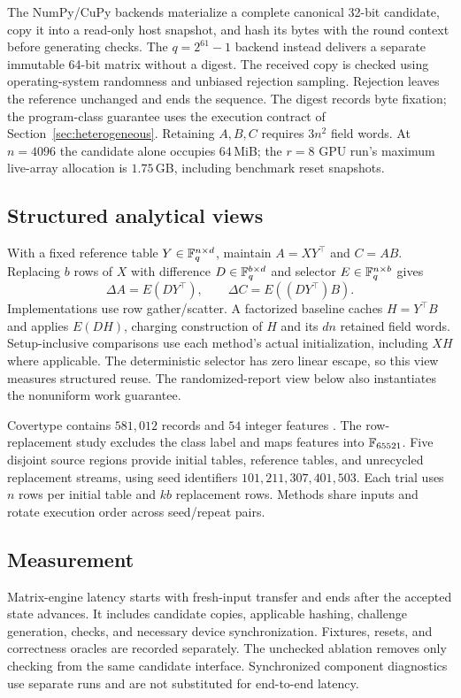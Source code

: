 The NumPy/CuPy backends materialize a complete canonical 32-bit candidate,
copy it into a read-only host snapshot, and hash its bytes with the round
context before generating checks. The $q=2^{61}-1$ backend instead
delivers a separate immutable 64-bit matrix without a digest.
The received copy is checked using
operating-system randomness and unbiased rejection sampling. Rejection
leaves the reference unchanged and ends the sequence. The digest records
byte fixation; the program-class guarantee uses the execution contract
of Section~\ref{sec:heterogeneous}.
Retaining $A,B,C$ requires $3n^2$ field words. At $n=4096$ the candidate
alone occupies $64$\,MiB; the $r=8$ GPU run's maximum live-array
allocation is $1.75$\,GB, including benchmark reset snapshots.

\subsection{Structured analytical views}
With a fixed reference table $Y\in\mathbb F_q^{n\times d}$, maintain
$A=XY^\top$ and $C=AB$. Replacing $b$ rows of $X$ with difference
$D\in\mathbb F_q^{b\times d}$ and selector $E\in\mathbb F_q^{n\times b}$ gives
\begin{equation}\label{eq:structured-update}
 \Delta A=E(DY^\top),\qquad \Delta C=E((DY^\top)B).
\end{equation}
Implementations use row gather/scatter. A factorized baseline caches
$H=Y^\top B$ and applies $E(DH)$, charging construction of $H$ and
its $dn$ retained field words. Setup-inclusive comparisons use each
method's actual initialization, including $XH$ where applicable.
The deterministic selector has zero linear escape, so this view measures
structured reuse. The randomized-report view below also instantiates
the nonuniform work guarantee.

Covertype contains $581,012$ records and $54$ integer features
\cite{covertype}. The row-replacement study excludes the class label
and maps features into $\mathbb F_{65521}$. Five disjoint source regions
provide initial tables, reference tables, and unrecycled replacement
streams, using seed identifiers $101,211,307,401,503$. Each trial uses
$n$ rows per initial table and $kb$ replacement rows. Methods share
inputs and rotate execution order across seed/repeat pairs.



\subsection{Measurement}
Matrix-engine latency starts with fresh-input transfer and ends after the
accepted state advances. It includes candidate copies, applicable hashing,
challenge generation, checks, and necessary device synchronization. Fixtures,
resets, and correctness oracles are recorded separately. The unchecked
ablation removes only checking from the same candidate interface.
Synchronized component diagnostics use separate runs and are not
substituted for end-to-end latency.


